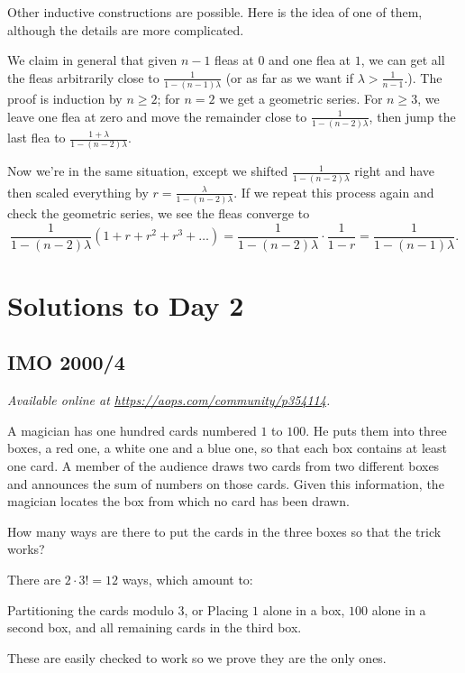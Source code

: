 \documentclass[11pt]{scrartcl}
\begin{document}
\begin{remark*}
  Other inductive constructions are possible.
  Here is the idea of one of them,
  although the details are more complicated.

  We claim in general that given $n-1$ fleas at $0$
  and one flea at $1$,
  we can get all the fleas arbitrarily close to
  $\frac{1}{1-(n-1)\lambda}$
  (or as far as we want if $\lambda > \frac{1}{n-1}$.).
  The proof is induction by $n \ge 2$;
  for $n=2$ we get a geometric series.
  For $n \ge 3$, we leave one flea at zero
  and move the remainder close to $\frac{1}{1-(n-2)\lambda}$,
  then jump the last flea to
  $\frac{1+\lambda}{1-(n-2)\lambda}$.

  Now we're in the same situation,
  except we shifted $\frac{1}{1-(n-2)\lambda}$ right
  and have then scaled everything by
  $r = \frac{\lambda}{1-(n-2)\lambda}$.
  If we repeat this process again and check the geometric series,
  we see the fleas converge to
  \[ \frac{1}{1-(n-2)\lambda}
    \left( 1 + r + r^2 + r^3 + \dots \right)
    = \frac{1}{1-(n-2)\lambda} \cdot \frac{1}{1-r}
    = \frac{1}{1-(n-1)\lambda}. \]
\end{remark*}
\pagebreak

\section{Solutions to Day 2}
\subsection{IMO 2000/4}
\textsl{Available online at \url{https://aops.com/community/p354114}.}
\begin{mdframed}[style=mdpurplebox,frametitle={Problem statement}]
A magician has one hundred cards numbered $1$ to $100$.
He puts them into three boxes, a red one, a white one and a blue one,
so that each box contains at least one card.
A member of the audience draws two cards from two different boxes
and announces the sum of numbers on those cards.
Given this information,
the magician locates the box from which no card has been drawn.

How many ways are there to put the cards
in the three boxes so that the trick works?
\end{mdframed}
There are $2 \cdot 3! = 12$ ways, which amount to:
\begin{itemize}
  \ii Partitioning the cards modulo $3$, or
  \ii Placing $1$ alone in a box,
  $100$ alone in a second box,
  and all remaining cards in the third box.
\end{itemize}
These are easily checked to work so we prove they are the only ones.
\end{document}
